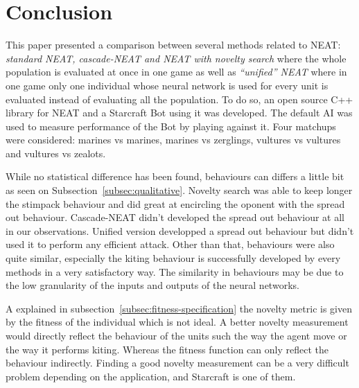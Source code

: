 \section{Conclusion}\label{section:conclusion}

This paper presented a comparison between several methods related to NEAT:
\emph{standard NEAT, cascade-NEAT and NEAT with novelty search} where the whole
population is evaluated at once in one game as well as \emph{``unified'' NEAT} where
in one game only one individual whose neural network is used for every unit is evaluated
instead of evaluating all the population.
To do so, an open source C++ library for NEAT and a Starcraft Bot using it was developed.
The default AI was used to measure performance of the Bot by playing against it.
Four matchups were considered: marines vs marines, marines vs zerglings, vultures vs vultures
and vultures vs zealots.

While no statistical difference has been found, behaviours can differs a little bit as seen
on Subsection~\ref{subsec:qualitative}. Novelty search was able to keep longer the
stimpack behaviour and did great at encircling the oponent with the spread out behaviour.
Cascade-NEAT didn't developed the spread out behaviour at all in our observations.
Unified version developped a spread out behaviour but didn't used it to perform any efficient attack.
Other than that, behaviours were also quite similar, especially the kiting behaviour is
successfully developed by every methods in a very satisfactory way. The similarity in behaviours may
be due to the low granularity of the inputs and outputs of the neural networks.

A explained in subsection~\ref{subsec:fitness-specification} the novelty metric is given by
the fitness of the individual which is not ideal. A better novelty measurement would directly reflect
the behaviour of the units such the way the agent move or the way it performs kiting. Whereas the fitness
function can only reflect the behaviour indirectly. Finding a good novelty measurement can be a
very difficult problem depending on the application, and Starcraft is one of them.

